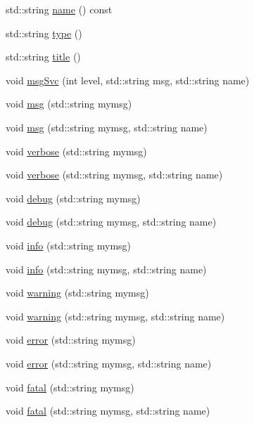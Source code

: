 \begin{DoxyCompactItemize}
\item 
std::string \hyperlink{classObject_a975e888d50bfcbffda2c86368332a5cd}{name} () const 
\item 
std::string \hyperlink{classObject_a84f99f70f144a83e1582d1d0f84e4e62}{type} ()
\item 
std::string \hyperlink{classObject_a73a0f1a41828fdd8303dd662446fb6c3}{title} ()
\item 
void \hyperlink{classObject_a3f9d5537ebce0c0f2bf6ae4d92426f3c}{msgSvc} (int level, std::string msg, std::string name)
\item 
void \hyperlink{classObject_a58b2d0618c2d08cf2383012611528d97}{msg} (std::string mymsg)
\item 
void \hyperlink{classObject_ac5d59299273cee27aacf7de00d2e7034}{msg} (std::string mymsg, std::string name)
\item 
void \hyperlink{classObject_a83d2db2df682907ea1115ad721c1c4a1}{verbose} (std::string mymsg)
\item 
void \hyperlink{classObject_a2d4120195317e2a3c6532e8bb9f3da68}{verbose} (std::string mymsg, std::string name)
\item 
void \hyperlink{classObject_aac010553f022165573714b7014a15f0d}{debug} (std::string mymsg)
\item 
void \hyperlink{classObject_a6c9a0397ca804e04d675ed05683f5420}{debug} (std::string mymsg, std::string name)
\item 
void \hyperlink{classObject_a644fd329ea4cb85f54fa6846484b84a8}{info} (std::string mymsg)
\item 
void \hyperlink{classObject_a1ca123253dfd30fc28b156f521dcbdae}{info} (std::string mymsg, std::string name)
\item 
void \hyperlink{classObject_a65cd4fda577711660821fd2cd5a3b4c9}{warning} (std::string mymsg)
\item 
void \hyperlink{classObject_a11f101db4dd73d9391b0231818881d86}{warning} (std::string mymsg, std::string name)
\item 
void \hyperlink{classObject_a204a95f57818c0f811933917a30eff45}{error} (std::string mymsg)
\item 
void \hyperlink{classObject_ad7f6c457733082efa2f9ff5f5c8e119a}{error} (std::string mymsg, std::string name)
\item 
void \hyperlink{classObject_aad5a16aac7516ce65bd5ec02ab07fc80}{fatal} (std::string mymsg)
\item 
void \hyperlink{classObject_ae62acd3d09f716220f75f252dc38bc9a}{fatal} (std::string mymsg, std::string name)
\item 

\end{DoxyCompactItemize}
